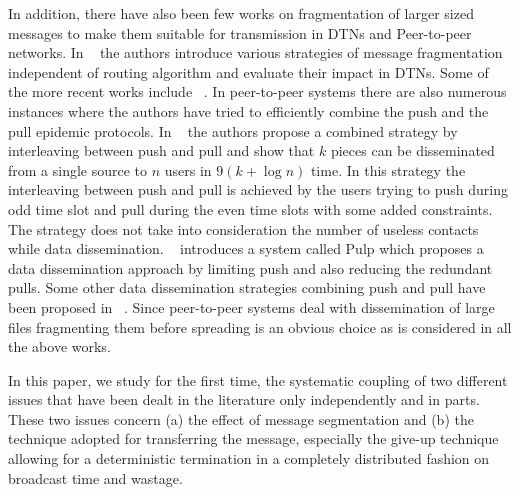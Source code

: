 In addition, there have also been few works on fragmentation of larger sized messages to make them 
suitable for transmission in DTNs and Peer-to-peer networks. In  
~\cite{mikko} the authors introduce various strategies of message fragmentation independent of routing algorithm and evaluate their impact in DTNs. 
Some of the more recent works include ~\cite{altamimi2014message,ginzboorg2014message}. 
In peer-to-peer systems there are also numerous instances where the authors 
have tried to efficiently combine the push and the pull epidemic protocols. In ~\cite{sanghavi2007gossiping} the authors propose a combined strategy 
by interleaving between push and pull and show that $k$ pieces can be disseminated from a single source to $n$ users in $9(k+\log n)$ time. 
In this strategy the interleaving between push and pull is achieved by the users trying to push during odd time slot and pull during the 
even time slots with some added constraints. The strategy does not take into consideration the number of useless contacts while data dissemination.
\fi
~\cite{felber2012pulp} introduces a system called Pulp which proposes a data dissemination approach 
by limiting push and also reducing the redundant pulls. 
Some other data dissemination strategies combining push and pull have been proposed in 
~\cite{lo2008some,ozkasap2009principles}. 
Since peer-to-peer systems deal with dissemination of large files fragmenting them before spreading is an obvious choice as is considered in all the 
above works.

In this paper, we study for the first time, the systematic
coupling of two different issues that have been dealt in the literature
only independently and in parts. These two issues concern
(a) the effect of message segmentation and (b) the technique adopted for transferring
the message, especially the give-up technique allowing for a
deterministic termination in a completely distributed fashion on broadcast time and wastage.

\medskip
